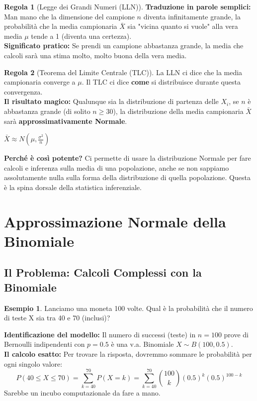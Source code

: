 \documentclass[a4paper, 11pt]{article}
\theoremstyle{definition}
\newtheorem{regola}{Regola}[section]
\newtheorem{esempio}{Esempio}[section]
\begin{document}
\begin{regola}[Legge dei Grandi Numeri (LLN)]
\textbf{Traduzione in parole semplici:} Man mano che la dimensione del campione $n$ diventa infinitamente grande, la probabilità che la media campionaria $\bar{X}$ sia "vicina quanto si vuole" alla vera media $\mu$ tende a 1 (diventa una certezza). \\
\textbf{Significato pratico:} Se prendi un campione abbastanza grande, la media che calcoli sarà una stima molto, molto buona della vera media.
\end{regola}

\begin{regola}[Teorema del Limite Centrale (TLC)]
La LLN ci dice che la media campionaria converge a $\mu$. Il TLC ci dice \textbf{come} si distribuisce durante questa convergenza. \\
\textbf{Il risultato magico:} Qualunque sia la distribuzione di partenza delle $X_i$, se $n$ è abbastanza grande (di solito $n \ge 30$), la distribuzione della media campionaria $\bar{X}$ sarà \textbf{approssimativamente Normale}.
\begin{formulabox}
    $\bar{X} \approx N\left(\mu, \frac{\sigma^2}{n}\right)$
\end{formulabox}
\textbf{Perché è così potente?} Ci permette di usare la distribuzione Normale per fare calcoli e inferenza sulla media di una popolazione, anche se non sappiamo assolutamente nulla sulla forma della distribuzione di quella popolazione. Questa è la spina dorsale della statistica inferenziale.
\end{regola}

\newpage

\section{Approssimazione Normale della Binomiale}
\subsection{Il Problema: Calcoli Complessi con la Binomiale}
\begin{esempio}
Lanciamo una moneta 100 volte. Qual è la probabilità che il numero di teste X sia tra 40 e 70 (inclusi)?
\end{esempio}
\textbf{Identificazione del modello:} Il numero di successi (teste) in $n=100$ prove di Bernoulli indipendenti con $p=0.5$ è una v.a. Binomiale $X \sim B(100, 0.5)$. \\
\textbf{Il calcolo esatto:} Per trovare la risposta, dovremmo sommare le probabilità per ogni singolo valore:
\[ P(40 \le X \le 70) = \sum_{k=40}^{70} P(X=k) = \sum_{k=40}^{70} \binom{100}{k} (0.5)^k (0.5)^{100-k} \]
Sarebbe un incubo computazionale da fare a mano.
\end{document}
